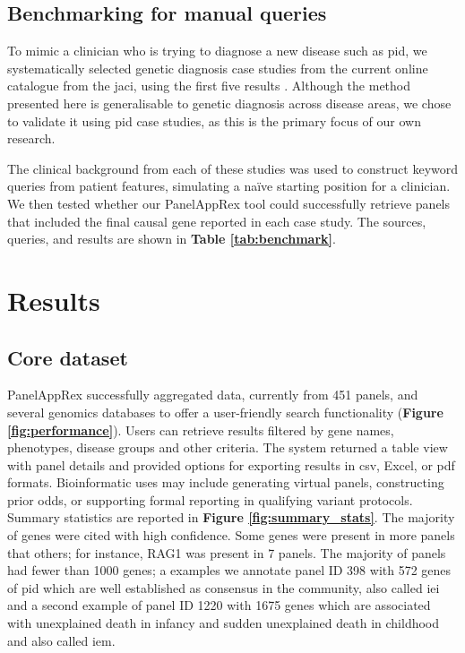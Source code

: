 \subsection{Benchmarking for manual queries}
\noindent
To mimic a clinician who is trying to diagnose a new disease such as \ac{pid}, we systematically selected genetic diagnosis case studies from the current online catalogue from the \ac{jaci}, using the first five results  \cite{arruda_genetic_2015, 
mcaleer_severe_2015,
verhoeven_hematopoietic_2022,
magerus-chatinet_autoimmune_2013,
sharfe_fatal_2014}. 
Although the method presented here is generalisable to genetic diagnosis across disease areas, we chose to validate it using \ac{pid} case studies, as this is the primary focus of our own research.

The clinical background from each of these studies was used to construct keyword queries from patient features, simulating a naïve starting position for a clinician.
We then tested whether our PanelAppRex tool could successfully retrieve panels that included the final causal gene reported in each case study. 
The sources, queries, and results are shown in \textbf{Table \ref{tab:benchmark}}. 

\section{Results}
\noindent
\subsection{Core dataset}
PanelAppRex successfully aggregated data, currently from 451 panels, and several genomics databases to offer a user-friendly search functionality (\textbf{Figure \ref{fig:performance}}).
Users can retrieve results filtered by gene names, phenotypes, disease groups and other criteria. 
The system returned a table view with panel details and provided options for exporting results in \ac{csv}, Excel, or \ac{pdf} formats.
Bioinformatic uses may include generating virtual panels, constructing prior odds, or supporting formal reporting in qualifying variant protocols.
Summary statistics are reported in 
\textbf{Figure \ref{fig:summary_stats}}. The majority of genes were cited with high confidence. Some genes were present in more panels that others; for instance, RAG1 was present in 7 panels. The majority of panels had fewer than 1000 genes; a
 examples we annotate 
panel ID 398 with 572 genes of \ac{pid} which are well established as consensus in the community, also called \ac{iei} and a second example
of panel ID 1220 with 1675 genes which are associated with unexplained death in infancy and sudden unexplained death in childhood and also called \ac{iem}.

